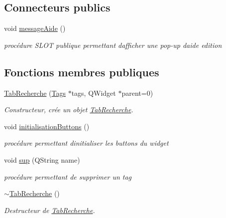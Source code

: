 \subsection*{Connecteurs publics}
\begin{DoxyCompactItemize}
\item 
void \hyperlink{class_tab_recherche_a3eae26f6020103f44a0ac5e27a35f0e1}{message\+Aide} ()\hypertarget{class_tab_recherche_a3eae26f6020103f44a0ac5e27a35f0e1}{}\label{class_tab_recherche_a3eae26f6020103f44a0ac5e27a35f0e1}

\begin{DoxyCompactList}\small\item\em procédure S\+L\+OT publique permettant d\textquotesingle{}afficher une pop-\/up d\textquotesingle{}aide edition \end{DoxyCompactList}\end{DoxyCompactItemize}
\subsection*{Fonctions membres publiques}
\begin{DoxyCompactItemize}
\item 
\hyperlink{class_tab_recherche_a97ce35f523049227c55bf651303bb4de}{Tab\+Recherche} (\hyperlink{class_tags}{Tags} $\ast$tags, Q\+Widget $\ast$parent=0)
\begin{DoxyCompactList}\small\item\em Constructeur, crée un objet \hyperlink{class_tab_recherche}{Tab\+Recherche}. \end{DoxyCompactList}\item 
void \hyperlink{class_tab_recherche_acf8a4104c762f41a3750d24473d17092}{initialisation\+Buttons} ()\hypertarget{class_tab_recherche_acf8a4104c762f41a3750d24473d17092}{}\label{class_tab_recherche_acf8a4104c762f41a3750d24473d17092}

\begin{DoxyCompactList}\small\item\em procédure permettant d\textquotesingle{}initialiser les buttons du widget \end{DoxyCompactList}\item 
void \hyperlink{class_tab_recherche_a81618866cd661b7f4f2578ca79ae47f7}{sup} (Q\+String name)
\begin{DoxyCompactList}\small\item\em procédure permettant de supprimer un tag \end{DoxyCompactList}\item 
\hyperlink{class_tab_recherche_ab39802929110947b784fb0bc420f69a5}{$\sim$\+Tab\+Recherche} ()\hypertarget{class_tab_recherche_ab39802929110947b784fb0bc420f69a5}{}\label{class_tab_recherche_ab39802929110947b784fb0bc420f69a5}

\begin{DoxyCompactList}\small\item\em Destructeur de \hyperlink{class_tab_recherche}{Tab\+Recherche}. \end{DoxyCompactList}\end{DoxyCompactItemize}


